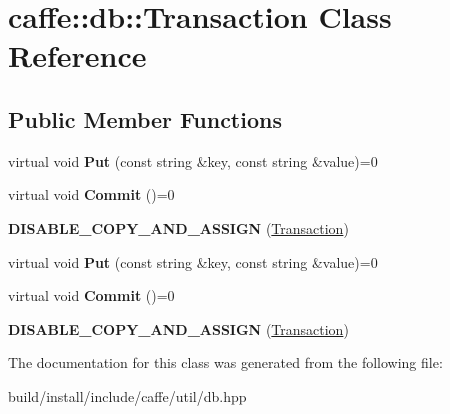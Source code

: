 \hypertarget{classcaffe_1_1db_1_1_transaction}{}\section{caffe\+:\+:db\+:\+:Transaction Class Reference}
\label{classcaffe_1_1db_1_1_transaction}
\subsection*{Public Member Functions}
\begin{DoxyCompactItemize}
\item 
\mbox{\label{classcaffe_1_1db_1_1_transaction_a1aa8960bfd0c4eefb348b1d03d8413e6}} 
virtual void {\bfseries Put} (const string \&key, const string \&value)=0
\item 
\mbox{\label{classcaffe_1_1db_1_1_transaction_a7671332a70ee234f85a7044a0d20d579}} 
virtual void {\bfseries Commit} ()=0
\item 
\mbox{\label{classcaffe_1_1db_1_1_transaction_a0cb78598bb826f9e4679628ad8aa8420}} 
{\bfseries D\+I\+S\+A\+B\+L\+E\+\_\+\+C\+O\+P\+Y\+\_\+\+A\+N\+D\+\_\+\+A\+S\+S\+I\+GN} (\mbox{\hyperlink{classcaffe_1_1db_1_1_transaction}{Transaction}})
\item 
\mbox{\label{classcaffe_1_1db_1_1_transaction_a1aa8960bfd0c4eefb348b1d03d8413e6}} 
virtual void {\bfseries Put} (const string \&key, const string \&value)=0
\item 
\mbox{\label{classcaffe_1_1db_1_1_transaction_a7671332a70ee234f85a7044a0d20d579}} 
virtual void {\bfseries Commit} ()=0
\item 
\mbox{\label{classcaffe_1_1db_1_1_transaction_a0cb78598bb826f9e4679628ad8aa8420}} 
{\bfseries D\+I\+S\+A\+B\+L\+E\+\_\+\+C\+O\+P\+Y\+\_\+\+A\+N\+D\+\_\+\+A\+S\+S\+I\+GN} (\mbox{\hyperlink{classcaffe_1_1db_1_1_transaction}{Transaction}})
\end{DoxyCompactItemize}


The documentation for this class was generated from the following file\+:\begin{DoxyCompactItemize}
\item 
build/install/include/caffe/util/db.\+hpp\end{DoxyCompactItemize}
